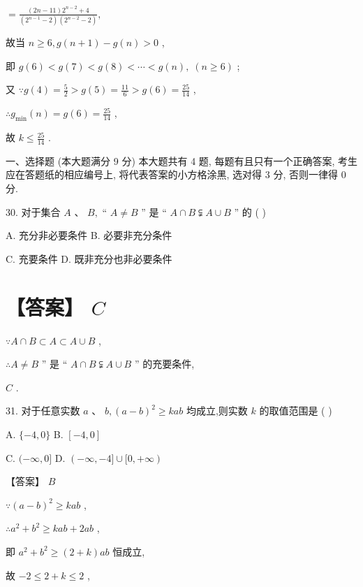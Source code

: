 \documentclass[10pt]{article}
\begin{document}
\(= \frac{\left( {{2n} - {11}}\right) {2}^{n - 2} + 4}{\left( {{2}^{n - 1} - 2}\right) \left( {{2}^{n - 2} - 2}\right) },\)

故当 \(n \geq  6,g\left( {n + 1}\right)  - g\left( n\right)  > 0\) ,

即 \(g\left( 6\right)  < g\left( 7\right)  < g\left( 8\right)  < \cdots  < g\left( n\right) ,\;\left( {n \geq  6}\right)\) ;

又 \(\because g\left( 4\right)  = \frac{5}{2} > g\left( 5\right)  = \frac{11}{6} > g\left( 6\right)  = \frac{25}{14}\) ,

\(\therefore {g}_{\min }\left( n\right)  = g\left( 6\right)  = \frac{25}{14}\) ,

故 \(k \leq  \frac{25}{14}\) .

一、选择题 (本大题满分 9 分) 本大题共有 4 题, 每题有且只有一个正确答案, 考生应在答题纸的相应编号上, 将代表答案的小方格涂黑, 选对得 3 分, 否则一律得 0 分.

30. 对于集合 \(A\text{ 、 }B,\) “ \(A \neq  B\) ” 是 “ \(A \cap  B \subsetneqq  A \cup  B\) ” 的 ( )

A. 充分非必要条件 B. 必要非充分条件

C. 充要条件 D. 既非充分也非必要条件

\section*{【答案】 \(C\)}

\(\because A \cap  B \subset  A \subset  A \cup  B\) ,

\(\therefore A \neq  B\) ” 是 “ \(A \cap  B \subsetneqq  A \cup  B\) ” 的充要条件,

\(C\) .

31. 对于任意实数 \(a\text{ 、 }b,{\left( a - b\right) }^{2} \geq  {kab}\) 均成立,则实数 \(k\) 的取值范围是 ( )

A. \(\{  - 4,0\}\) B. \(\left\lbrack  {-4,0}\right\rbrack\)

C. \(( - \infty ,0\rbrack\) D. \(\left( {-\infty , - 4\rbrack \cup \lbrack 0, + \infty }\right)\)

【答案】 \(B\)

\(\because {\left( a - b\right) }^{2} \geq  {kab}\) ,

\(\therefore {a}^{2} + {b}^{2} \geq  {kab} + {2ab}\) ,

即 \({a}^{2} + {b}^{2} \geq  \left( {2 + k}\right) {ab}\) 恒成立,

故 \(- 2 \leq  2 + k \leq  2\) ,
\end{document}
